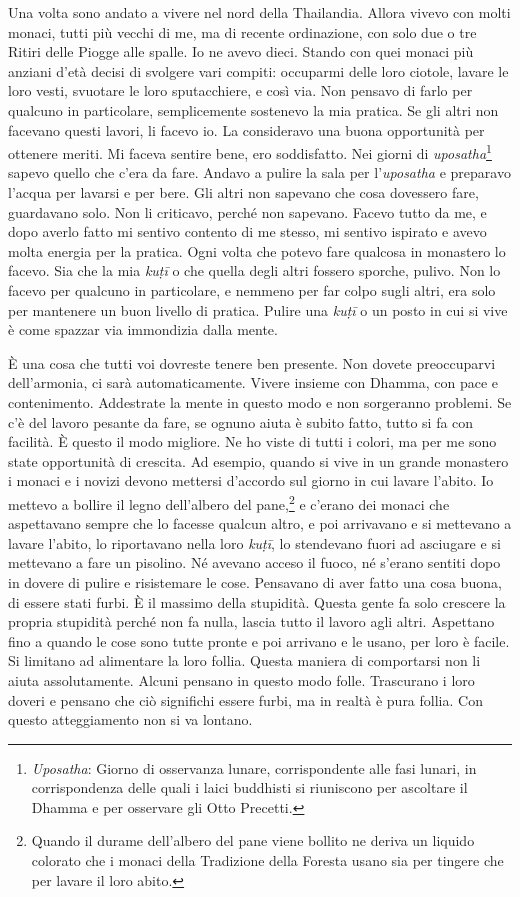 Una volta sono andato a vivere nel nord della Thailandia. Allora vivevo
con molti monaci, tutti più vecchi di me, ma di recente ordinazione, con
solo due o tre Ritiri delle Piogge alle spalle. Io ne avevo dieci.
Stando con quei monaci più anziani d'età decisi di svolgere vari
compiti: occuparmi delle loro ciotole, lavare le loro vesti, svuotare le
loro sputacchiere, e così via. Non pensavo di farlo per qualcuno in
particolare, semplicemente sostenevo la mia pratica. Se gli altri non
facevano questi lavori, li facevo io. La consideravo una buona
opportunità per ottenere meriti. Mi faceva sentire bene, ero
soddisfatto. Nei giorni di \emph{uposatha}\footnote{\emph{Uposatha}:
  Giorno di osservanza lunare, corrispondente alle fasi lunari, in
  corrispondenza delle quali i laici buddhisti si riuniscono per
  ascoltare il Dhamma e per osservare gli Otto Precetti.} sapevo quello
che c'era da fare. Andavo a pulire la sala per l'\emph{uposatha} e
preparavo l'acqua per lavarsi e per bere. Gli altri non sapevano che
cosa dovessero fare, guardavano solo. Non li criticavo, perché non
sapevano. Facevo tutto da me, e dopo averlo fatto mi sentivo contento di
me stesso, mi sentivo ispirato e avevo molta energia per la pratica.
Ogni volta che potevo fare qualcosa in monastero lo facevo. Sia che la
mia \emph{kuṭī} o che quella degli altri fossero sporche, pulivo. Non lo
facevo per qualcuno in particolare, e nemmeno per far colpo sugli altri,
era solo per mantenere un buon livello di pratica. Pulire una
\emph{kuṭī} o un posto in cui si vive è come spazzar via immondizia
dalla mente.

È una cosa che tutti voi dovreste tenere ben presente. Non dovete
preoccuparvi dell'armonia, ci sarà automaticamente. Vivere insieme con
Dhamma, con pace e contenimento. Addestrate la mente in questo modo e
non sorgeranno problemi. Se c'è del lavoro pesante da fare, se ognuno
aiuta è subito fatto, tutto si fa con facilità. È questo il modo
migliore. Ne ho viste di tutti i colori, ma per me sono state
opportunità di crescita. Ad esempio, quando si vive in un grande
monastero i monaci e i novizi devono mettersi d'accordo sul giorno in
cui lavare l'abito. Io mettevo a bollire il legno dell'albero del
pane,\footnote{Quando il durame dell'albero del pane viene bollito ne
  deriva un liquido colorato che i monaci della Tradizione della Foresta
  usano sia per tingere che per lavare il loro abito.} e c'erano dei
monaci che aspettavano sempre che lo facesse qualcun altro, e poi
arrivavano e si mettevano a lavare l'abito, lo riportavano nella loro
\emph{kuṭī}, lo stendevano fuori ad asciugare e si mettevano a fare un
pisolino. Né avevano acceso il fuoco, né s'erano sentiti dopo in dovere
di pulire e risistemare le cose. Pensavano di aver fatto una cosa buona,
di essere stati furbi. È il massimo della stupidità. Questa gente fa
solo crescere la propria stupidità perché non fa nulla, lascia tutto il
lavoro agli altri. Aspettano fino a quando le cose sono tutte pronte e
poi arrivano e le usano, per loro è facile. Si limitano ad alimentare la
loro follia. Questa maniera di comportarsi non li aiuta assolutamente.
Alcuni pensano in questo modo folle. Trascurano i loro doveri e pensano
che ciò significhi essere furbi, ma in realtà è pura follia. Con questo
atteggiamento non si va lontano.


